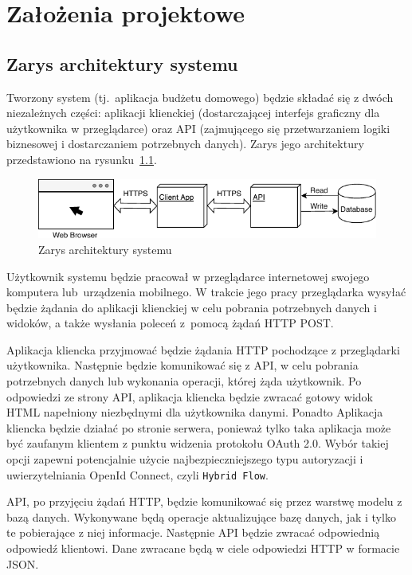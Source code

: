 \chapter{Założenia projektowe}
\label{chap:zalozenia-projektowe}
\section{Zarys architektury systemu}
\label{sec:zarys-arch}
Tworzony system (tj.\ aplikacja budżetu domowego) będzie składać się z dwóch niezależnych części: aplikacji klienckiej (dostarczającej interfejs graficzny dla użytkownika w przeglądarce) oraz API (zajmującego się przetwarzaniem logiki biznesowej i dostarczaniem potrzebnych danych). Zarys jego architektury przedstawiono na rysunku~\ref{fig:ogolna-arch}.
\begin{figure}[h]
	\centering
	\includegraphics[width=.9\linewidth]{rys03/ogolna-arch.pdf}
	\caption{Zarys architektury systemu}
	\label{fig:ogolna-arch}
\end{figure}

Użytkownik systemu będzie pracował w przeglądarce internetowej swojego komputera lub~urządzenia mobilnego. W trakcie jego pracy przeglądarka wysyłać będzie żądania do aplikacji klienckiej w celu pobrania potrzebnych danych i widoków, a także wysłania poleceń z~pomocą żądań HTTP POST.

Aplikacja kliencka przyjmować będzie żądania HTTP pochodzące z przeglądarki użytkownika. Następnie będzie komunikować się z API, w celu pobrania potrzebnych danych lub wykonania operacji, której żąda użytkownik. Po odpowiedzi ze strony API, aplikacja kliencka będzie zwracać gotowy widok HTML napełniony niezbędnymi dla użytkownika danymi. Ponadto Aplikacja kliencka będzie działać po stronie serwera, ponieważ tylko taka aplikacja może być zaufanym klientem z punktu widzenia protokołu OAuth 2.0. Wybór takiej opcji zapewni potencjalnie użycie najbezpieczniejszego typu autoryzacji i uwierzytelniania OpenId Connect, czyli \texttt{Hybrid Flow}. 

API, po przyjęciu żądań HTTP, będzie komunikować się przez warstwę modelu z bazą danych. Wykonywane będą operacje aktualizujące bazę danych, jak i tylko te pobierające z niej informacje. Następnie API będzie zwracać odpowiednią odpowiedź klientowi. Dane zwracane będą w ciele odpowiedzi HTTP w formacie JSON.

